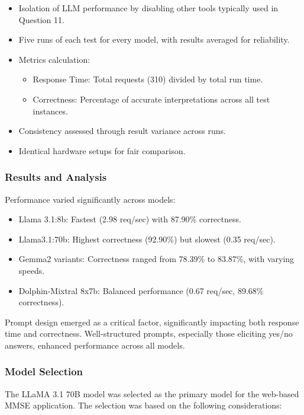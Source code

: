 \begin{itemize}
    \item Isolation of LLM performance by disabling other tools typically used in Question 11.
    \item Five runs of each test for every model, with results averaged for reliability.
    \item Metrics calculation: 
        \begin{itemize}
            \item Response Time: Total requests (310) divided by total run time.
            \item Correctness: Percentage of accurate interpretations across all test instances.
        \end{itemize}
    \item Consistency assessed through result variance across runs.
    \item Identical hardware setups for fair comparison.
\end{itemize}

\subsubsection{Results and Analysis}
Performance varied significantly across models:

\begin{itemize}
    \item Llama 3.1:8b: Fastest (2.98 req/sec) with 87.90\% correctness.
    \item Llama3.1:70b: Highest correctness (92.90\%) but slowest (0.35 req/sec).
    \item Gemma2 variants: Correctness ranged from 78.39\% to 83.87\%, with varying speeds.
    \item Dolphin-Mixtral 8x7b: Balanced performance (0.67 req/sec, 89.68\% correctness).
\end{itemize}

Prompt design emerged as a critical factor, significantly impacting both response time and correctness. Well-structured prompts, especially those eliciting yes/no answers, enhanced performance across all models.

\subsubsection{Model Selection}
The LLaMA 3.1 70B model was selected as the primary model for the web-based MMSE application. The selection was based on the following considerations:

